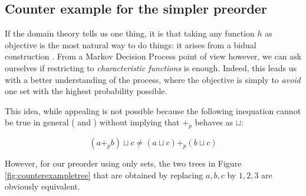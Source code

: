 \subsection{Counter example for the simpler preorder}

If the domain theory tells us one thing, it is that 
taking any function $h$ as objective is the most 
natural way to do things: it arises from 
a bidual  construction \cite{JGL-mscs16}. 
From a Markov Decision Process point of view 
however, we can ask ourselves if restricting 
to \emph{characteristic functions} is enough. 
Indeed, this leads us with a better understanding 
of the process, where the objective is simply
to \emph{avoid} one set with the highest probability 
possible. 

This idea, while appealing is not possible because 
the following inequation cannot be true in general
(\cite{Mislove2000} and \cite{mislove2004axioms}) without 
implying that $+_p$ behaves as $\sqcup$:

\begin{equation*}
    (a +_p b) \sqcup c \neq 
    (a \sqcup c) +_p (b \sqcup c)
\end{equation*}

However, for our preorder using only sets, the 
two trees in Figure \ref{fig:counterexampletree} that are obtained by replacing $a,b,c$ 
by $1,2,3$ are obviously equivalent. 

